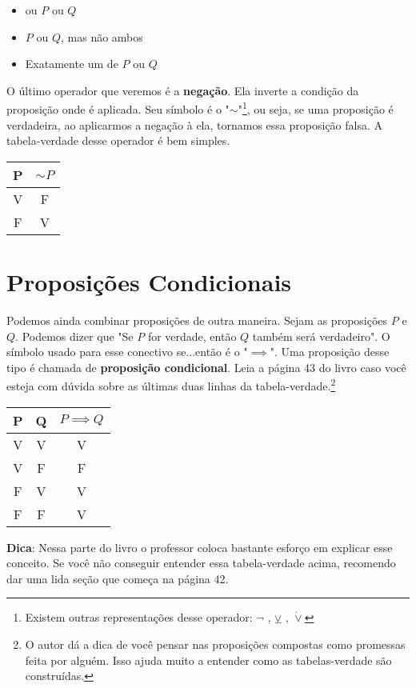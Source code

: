 \documentclass[a4paper,11pt]{book}
\theoremstyle{definition}
\theoremstyle{break}
\begin{document}
\begin{itemize}
\item ou $P$ ou $Q$
\item $P$ ou $Q$, mas não ambos
\item Exatamente um de $P$ ou $Q$
\end{itemize}

O último operador que veremos é a \textbf{negação}. Ela inverte a condição da proposição onde é aplicada. Seu símbolo é o "$\sim$"\footnote{Existem outras representações desse operador: $\lnot$ , $\veebar$ , $\dot\lor$}, ou seja, se uma proposição é verdadeira, ao aplicarmos a negação à ela, tornamos essa proposição falsa. A tabela-verdade desse operador é bem simples.

\begin{center}
\begin{tabular}{ c || c }
 P & $\sim P$ \\ 
 \hline
 V & F \\  
 F & V
\end{tabular}
\end{center}

\section{Proposições Condicionais}

Podemos ainda combinar proposições de outra maneira. Sejam as proposições $P$ e $Q$. Podemos dizer que "Se $P$ for verdade, então $Q$ também será verdadeiro". O símbolo usado para esse conectivo se...então é o "$\implies$". Uma proposição desse tipo é chamada de \textbf{proposição condicional}. Leia a página 43 do livro caso você esteja com dúvida sobre as últimas duas linhas da tabela-verdade.\footnote{O autor dá a dica de você pensar nas proposições compostas como promessas feita por alguém. Isso ajuda muito a entender como as tabelas-verdade são construídas.}

\begin{center}
\begin{tabular}{ c c || c }
 P & Q & $P \implies Q$ \\ 
 \hline
 V & V & V \\  
 V & F & F \\  
 F & V & V \\  
 F & F & V
\end{tabular}
\end{center}

\textbf{Dica}: Nessa parte do livro o professor coloca bastante esforço em explicar esse conceito. Se você não conseguir entender essa tabela-verdade acima, recomendo dar uma lida seção que começa na página 42.
\end{document}
